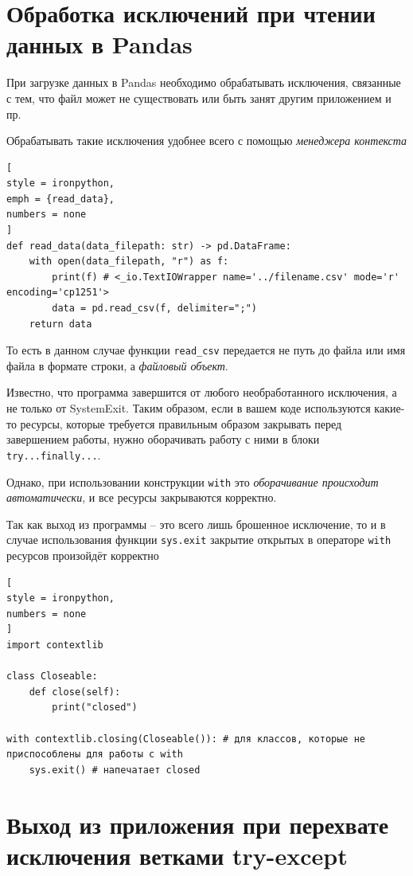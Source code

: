 \documentclass[%
	11pt,
	a4paper,
	utf8,
		]{article}
\begin{document}
\section{Обработка исключений при чтении данных в Pandas}

При загрузке данных в Pandas необходимо обрабатывать исключения, связанные с тем, что файл может не существовать или быть занят другим приложением и пр.

Обрабатывать такие исключения удобнее всего с помощью \emph{менеджера контекста}
\begin{lstlisting}[
style = ironpython,
emph = {read_data},
numbers = none	
]
def read_data(data_filepath: str) -> pd.DataFrame:
    with open(data_filepath, "r") as f:
        print(f) # <_io.TextIOWrapper name='../filename.csv' mode='r' encoding='cp1251'>
        data = pd.read_csv(f, delimiter=";")
    return data
\end{lstlisting}

То есть в данном случае функции \texttt{read\_csv} передается не путь до файла или имя файла в формате строки, а \emph{файловый объект}.

Известно, что программа завершится от любого необработанного исключения, а не только от SystemExit. Таким образом, если в вашем коде используются какие-то ресурсы, которые требуется правильным образом закрывать перед завершением работы, нужно оборачивать работу с ними в блоки \texttt{try...finally...}.

Однако, при использовании конструкции \texttt{with} это \emph{оборачивание происходит автоматически}, и все ресурсы закрываются корректно.

Так как выход из программы -- это всего лишь брошенное исключение, то и в случае использования функции \texttt{sys.exit} закрытие открытых в операторе \texttt{with} ресурсов произойдёт корректно
\begin{lstlisting}[
style = ironpython,
numbers = none	
]
import contextlib

class Closeable:
    def close(self):
        print("closed")

with contextlib.closing(Closeable()): # для классов, которые не приспособлены для работы с with
    sys.exit() # напечатает closed
\end{lstlisting}

\section{Выход из приложения при перехвате исключения ветками try-except}
\end{document}
